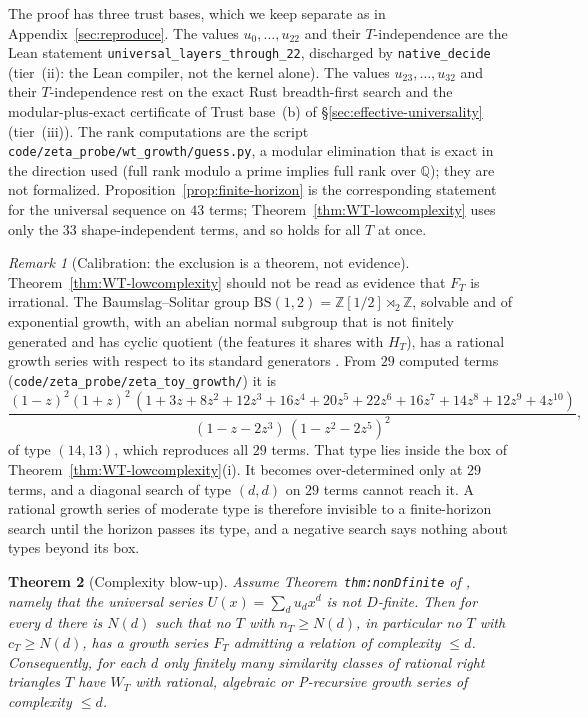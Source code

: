 \documentclass[11pt]{article}
\theoremstyle{plain}
\newtheorem{theorem}{Theorem}
\theoremstyle{definition}
\theoremstyle{remark}
\newtheorem{remark}[theorem]{Remark}
\newcommand{\Z}{\mathbb{Z}}
\newcommand{\Q}{\mathbb{Q}}
\begin{document}
The proof has three trust bases, which we keep separate as in
Appendix~\ref{sec:reproduce}. The values $u_0,\dots,u_{22}$ and their
$T$-independence are the Lean statement \texttt{universal\_layers\_through\_22},
discharged by \texttt{native\_decide} (tier~(ii): the Lean compiler, not the
kernel alone). The values $u_{23},\dots,u_{32}$ and their $T$-independence rest
on the exact Rust breadth-first search and the modular-plus-exact certificate of
Trust base~(b) of \S\ref{sec:effective-universality} (tier~(iii)). The rank
computations are the script \texttt{code/zeta\_probe/wt\_growth/guess.py}, a
modular elimination that is exact in the direction used (full rank modulo a
prime implies full rank over $\Q$); they are not formalized.
Proposition~\ref{prop:finite-horizon} is the corresponding statement for the
universal sequence on $43$ terms; Theorem~\ref{thm:WT-lowcomplexity} uses only
the $33$ shape-independent terms, and so holds for all $T$ at once.

\begin{remark}[Calibration: the exclusion is a theorem, not evidence]
\label{rem:BS-calibration}
Theorem~\ref{thm:WT-lowcomplexity} should not be read as evidence that $F_T$ is
irrational. The Baumslag--Solitar group
$\mathrm{BS}(1,2)=\Z[1/2]\rtimes_2\Z$, solvable and of exponential growth, with an
abelian normal subgroup that is not finitely generated and has cyclic
quotient (the features it shares with $H_T$), has a rational growth series with
respect to its standard generators \cite{CEG1994}. From $29$ computed terms
(\texttt{code/zeta\_probe/zeta\_toy\_growth/}) it is
\[
  \frac{(1-z)^2(1+z)^2\,(1+3z+8z^2+12z^3+16z^4+20z^5+22z^6+16z^7+14z^8+12z^9+4z^{10})}
       {(1-z-2z^3)\,(1-z^2-2z^5)^2},
\]
of type $(14,13)$, which reproduces all $29$ terms. That type lies inside the
box of Theorem~\ref{thm:WT-lowcomplexity}(i). It becomes over-determined only at
$29$ terms, and a diagonal search of type $(d,d)$ on $29$ terms cannot reach it.
A rational growth series of moderate type is therefore invisible to a
finite-horizon search until the horizon passes its type, and a negative search
says nothing about types beyond its box.
\end{remark}

\begin{theorem}[Complexity blow-up]
\label{thm:WT-blowup}
Assume Theorem~\texttt{thm:nonDfinite} of \cite{Bonfioli2026b}, namely that the
universal series $U(x)=\sum_du_dx^d$ is not $D$-finite. Then for every $d$
there is $N(d)$ such that no $T$ with $n_T\ge N(d)$, in particular no $T$ with
$c_T\ge N(d)$, has a growth series $F_T$ admitting a relation of complexity
$\le d$. Consequently, for each $d$ only finitely many similarity classes of
rational right triangles $T$ have $W_T$ with rational, algebraic or
P-recursive growth series of complexity $\le d$.
\end{theorem}
\end{document}
